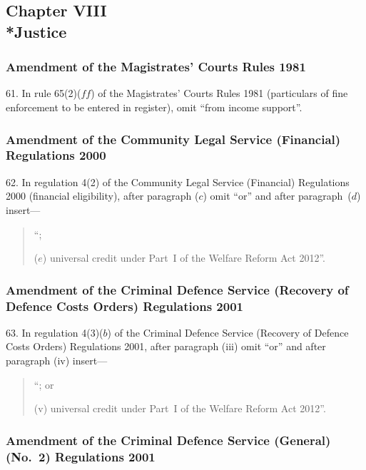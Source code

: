 \documentclass[12pt,a4paper]{article}
\begin{document}
\subsection[Chapter VIII --- Justice]{Chapter VIII\\*Justice}

\renewcommand\parthead{--- Part III Chapter VIII}

\subsubsection[61. Amendment of the Magistrates’ Courts Rules 1981]{Amendment of the Magistrates’ Courts Rules 1981}

61.  In rule 65(2)($ff$)  of the Magistrates’ Courts Rules 1981 (particulars of fine enforcement to be entered in register), omit “from income support”.

\subsubsection[62. Amendment of the Community Legal Service (Financial) Regulations 2000]{Amendment of the Community Legal Service (Financial) Regulations 2000}

62.  In regulation 4(2) of the Community Legal Service (Financial) Regulations 2000 (financial eligibility), after paragraph ($c$)  omit “or” and after paragraph~($d$)  insert—
\begin{quotation}
“;

($e$) universal credit under Part~I of the Welfare Reform Act 2012”.
\end{quotation}

\subsubsection[63. Amendment of the Criminal Defence Service (Recovery of Defence Costs Orders) Regulations 2001]{Amendment of the Criminal Defence Service (Recovery of Defence Costs Orders) Regulations 2001}

63.  In regulation 4(3)($b$)  of the Criminal Defence Service (Recovery of Defence Costs Orders) Regulations 2001, after paragraph (iii)  omit “or” and after paragraph (iv)  insert—
\begin{quotation}
“; or

(v) universal credit under Part~I of the Welfare Reform Act 2012”.
\end{quotation}

\subsubsection[64. Amendment of the Criminal Defence Service (General) (No.~2) Regulations 2001]{Amendment of the Criminal Defence Service (General) (No.~2) Regulations 2001}
\end{document}
